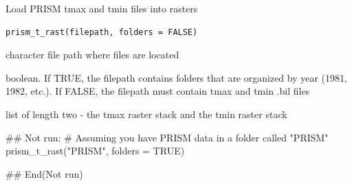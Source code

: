 %
\begin{Description}
Load PRISM tmax and tmin files into rasters
\end{Description}
%
\begin{Usage}
\begin{verbatim}
prism_t_rast(filepath, folders = FALSE)
\end{verbatim}
\end{Usage}
%
\begin{Arguments}
\begin{ldescription}
\item[\code{filepath}] character file path where files are located

\item[\code{folders}] boolean. If TRUE, the filepath contains folders that are
organized by year (1981, 1982, etc.). If FALSE, the filepath must contain
tmax and tmin .bil files
\end{ldescription}
\end{Arguments}
%
\begin{Value}
list of length two - the tmax raster stack and the tmin raster
stack
\end{Value}
%
\begin{Examples}
\begin{ExampleCode}
## Not run: 
# Assuming you have PRISM data in a folder called "PRISM"
prism_t_rast("PRISM", folders = TRUE)

## End(Not run)
\end{ExampleCode}
\end{Examples}

